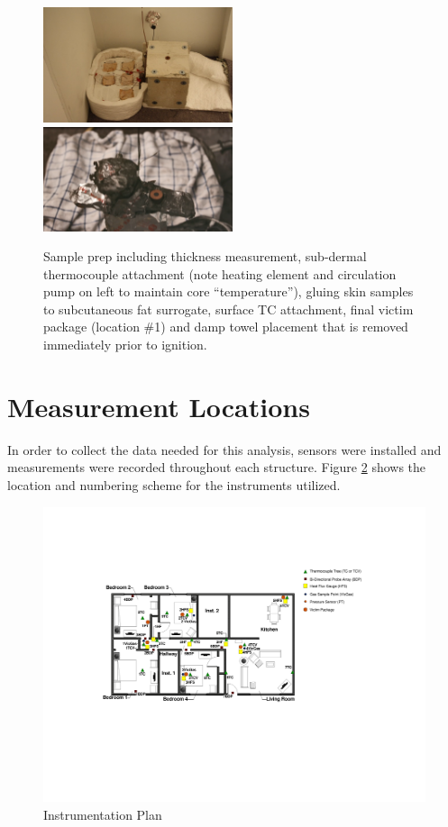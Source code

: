 \documentclass[12pt,oneside]{book}
\begin{document}
\begin{figure}[H]
\includegraphics[width=0.495\textwidth]{../0_Images/Instrumentation/Burn_Measurements/SBA_Deployed}
\includegraphics[width=0.495\textwidth]{../0_Images/Instrumentation/Burn_Measurements/SBA_Damp_Towel}
\caption{Sample prep including thickness measurement, sub-dermal thermocouple attachment (note heating element and circulation pump on left to maintain core ``temperature''), gluing skin samples to subcutaneous fat surrogate, surface TC attachment, final victim package (location \#1) and damp towel placement that is removed immediately prior to ignition.}
\label{fig:inst_SBA_Prep}
\end{figure}


\section{Measurement Locations}

In order to collect the data needed for this analysis, sensors were installed and measurements were recorded throughout each structure. Figure \ref{fig:instruments} shows the location and numbering scheme for the instruments utilized. 

\begin{figure}[H]
\includegraphics[width=.75\textheight]{0_Images/Ranch_Pictures/Instrument_Plan}
\caption{Instrumentation Plan}
\label{fig:instruments}
\end{figure}
\end{document}
